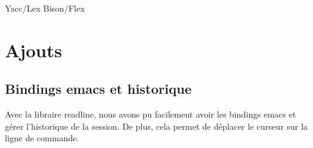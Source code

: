 \documentclass[a4paper]{article}
\begin{document}
    Yacc/Lex Bison/Flex

\section*{Ajouts}
    \subsection*{Bindings emacs et historique}
        Avec la libraire readline, nous avons pu facilement avoir les bindings
        emacs et g\'erer l'historique de la session. De plus, cela permet de
        d\'eplacer le curseur sur la ligne de commande.
\end{document}
